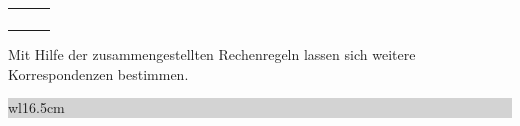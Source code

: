\begin{table}[H]
{\begin{tabular}{| c | c | c |}
\parbox[c][0.7in][c]{1.6in}{} & 
\parbox[c][0.7in][c]{1.8in}{} &
\parbox[c][0.7in][c]{2.9in}{}\\
\hline

\parbox[c][0.5in][c]{1.6in}{} & 
\parbox[c][0.5in][c]{1.8in}{} &
\parbox[c][0.5in][c]{2.9in}{}\\
\hline

\parbox[c][0.5in][c]{1.6in}{} & 
\parbox[c][0.5in][c]{1.8in}{} &
\parbox[c][0.5in][c]{2.9in}{}\\
\hline

\parbox[c][0.5in][c]{1.6in}{} & 
\parbox[c][0.5in][c]{1.8in}{} &
\parbox[c][0.5in][c]{2.9in}{}\\
\hline

\parbox[c][0.7in][c]{1.6in}{} & 
\parbox[c][0.7in][c]{1.8in}{} &
\parbox[c][0.7in][c]{2.9in}{}\\
\hline

\end{tabular}%
}
\label{tab:sevenfour}
\end{table}

\noindent Mit Hilfe der zusammengestellten Rechenregeln lassen sich weitere Korrespondenzen bestimmen. 

\clearpage

\noindent
\colorbox{lightgray}{%
%
\renewcommand\arraystretch{0.6}%
\begin{tabular}{ wl{16.5cm} }
{\selectfont{Beispiel: Fourier-Transformierte der Sprungfolge}}
\end{tabular}%
}\medskip

